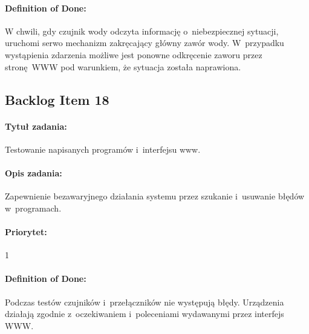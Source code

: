 	\paragraph{Definition of Done:}
	W chwili, gdy czujnik wody odczyta informację o~niebezpiecznej sytuacji, uruchomi serwo mechanizm zakręcający główny zawór wody. W~przypadku wystąpienia zdarzenia możliwe jest ponowne odkręcenie zaworu przez stronę WWW pod warunkiem, że sytuacja została naprawiona.


\subsection{Backlog Item 18}
\paragraph{Tytuł zadania:}
Testowanie napisanych programów i~interfejsu www.

\paragraph{Opis zadania:} 
Zapewnienie bezawaryjnego działania systemu przez szukanie i~usuwanie błędów w~programach.

\paragraph{Priorytet:} 
1

\paragraph{Definition of Done:}
Podczas testów czujników i~przełączników nie występują błędy. Urządzenia działają zgodnie z~oczekiwaniem i~poleceniami wydawanymi przez interfejs WWW.


	
